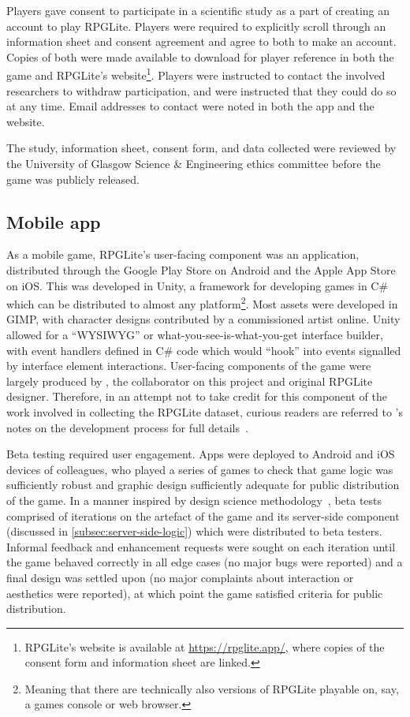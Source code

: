Players gave consent to participate in a scientific study as a part of creating
an account to play RPGLite. Players were required to explicitly scroll through
an information sheet and consent agreement and agree to both to make an account.
Copies of both were made available to download for player reference in both the
game and RPGLite's website\footnote{RPGLite's website is available at
\href{https://rpglite.app/}{https://rpglite.app/}, where copies of the consent
form and information sheet are linked.}. Players were instructed to
contact the involved researchers to withdraw participation, and were instructed
that they could do so at any time. Email addresses to contact were noted in both
the app and the website.

The study, information sheet, consent form, and data collected were reviewed by
the University of Glasgow Science \& Engineering ethics committee before the
game was publicly released.

\subsection{Mobile app}

As a mobile game, RPGLite's user-facing component was an application,
distributed through the Google Play Store on Android and the Apple App Store on
iOS. This was developed in Unity, a framework for developing games in C\# which
can be distributed to almost any platform\footnote{Meaning that there are
technically also versions of RPGLite playable on, say, a games console or web
browser.}. Most assets were developed in GIMP, with character designs
contributed by a commissioned artist online. Unity allowed for a ``WYSIWYG'' or
what-you-see-is-what-you-get interface builder, with event handlers defined in
C\# code which would ``hook'' into events signalled by interface element
interactions. User-facing components of the game were largely produced by
\citeauthor{kavanagh2021thesis}, the collaborator on this project and original
RPGLite designer. Therefore, in an attempt not to take credit for this component
of the work involved in collecting the RPGLite dataset, curious readers are
referred to \citeauthor{kavanagh2021thesis}'s notes on the development process
for full details~\cite{kavanagh2021thesis}.

Beta testing required user engagement. Apps were deployed to Android and iOS
devices of colleagues, who played a series of games to check that game logic was
sufficiently robust and graphic design sufficiently adequate for public
distribution of the game. In a manner inspired by design science
methodology~\cite{johannesson2014introduction}, beta tests comprised of
iterations on the artefact of the game and its server-side component (discussed
in \cref{subsec:server-side-logic}) which were distributed to beta testers.
Informal feedback and enhancement requests were sought on each iteration until
the game behaved correctly in all edge cases (no major bugs were reported) and a
final design was settled upon (no major complaints about interaction or
aesthetics were reported), at which point the game satisfied criteria for public
distribution.


